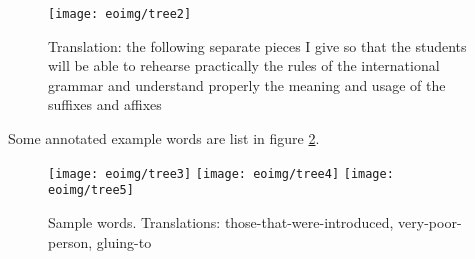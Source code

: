 \documentclass[10pt,a4paper]{article}
\begin{document}
\begin{figure}
\centering
\texttt{[image: eoimg/tree2]}
\caption{Translation: the following separate pieces I give so that the students
will be able to rehearse practically the rules of the international grammar and understand properly the meaning and usage of the suffixes and affixes}
\label{s2}
\end{figure}

Some annotated example words are list in figure \ref{w1}.

\begin{comment}
\begin{verbatim}
(JJ (JJ (V (V (P en) (V konduk)) (V it)) a) j)

(NN (N (J (J (A mal) (J riĉ)) (A eg)) (A ul)) o)

(VB (P al) (VB (V glu) i))
\end{verbatim}
\end{comment}

\begin{figure}
\texttt{[image: eoimg/tree3]}
\texttt{[image: eoimg/tree4]}
\texttt{[image: eoimg/tree5]}
\caption{Sample words. Translations: those-that-were-introduced, 
very-poor-person, gluing-to}
\label{w1}
\end{figure}
\end{document}

